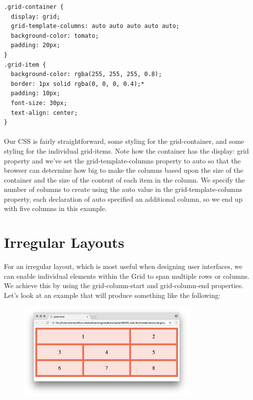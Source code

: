 \begin{lstlisting}
.grid-container {
  display: grid;
  grid-template-columns: auto auto auto auto auto;
  background-color: tomato;
  padding: 20px;
}
.grid-item {
  background-color: rgba(255, 255, 255, 0.8);
  border: 1px solid rgba(0, 0, 0, 0.4);*
  padding: 10px;
  font-size: 30px;
  text-align: center;
}
\end{lstlisting}

\paragraph{} Our CSS is fairly straightforward, some styling for the grid-container, and some styling for the individual grid-items. Note how the container has the display: grid property and we've set the grid-template-columns property to auto so that the browser can determine how big to make the columns based upon the size of the container and the size of the content of each item in the column. We specify the number of columns to create using the auto value in the grid-template-columns property, each declaration of auto specified an additional column, so we end up with five columns in this example.



\section{Irregular Layouts}
\paragraph{} For an irregular layout, which is most useful when designing user interfaces, we can enable individual elements within the Grid to span multiple rows or columns. We achieve this by using the grid-column-start and grid-column-end properties. Let's look at an example that will produce something like the following:


\begin{figure}[H]
\centering
\includegraphics[width=0.8\textwidth]{figures/grid-irregular}
\label{fig:grid-irregular}
\caption{}
\end{figure}



